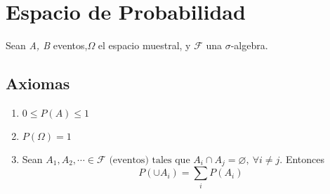 \chapter{Espacio de Probabilidad}
Sean \textit{A, B} eventos,$\Omega$ el espacio muestral, y $\mathcal F$ una $\sigma$-algebra.
\section{Axiomas}
\begin{enumerate}
  \item $0 \le P(A) \le 1$
  \item $P(\Omega) = 1$
  \item Sean $A_1, A_2, \cdots \in \mathcal F \text{ (eventos) tales que } A_i \cap A_j = \varnothing, ~\forall i \neq j.$ Entonces $$P(\cup A_i) = \sum_i P(A_i)$$
\end{enumerate}



